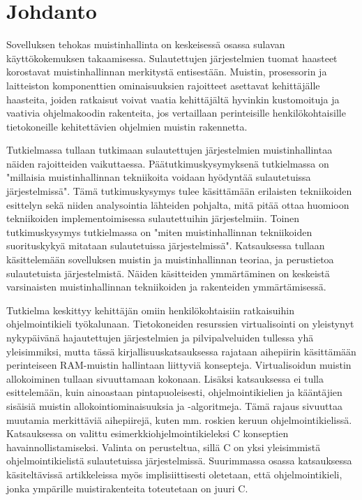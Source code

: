 \chapter{Johdanto} \label{Johdanto}

Sovelluksen tehokas muistinhallinta on keskeisessä osassa sulavan käyttökokemuksen takaamisessa. Sulautettujen järjestelmien tuomat haasteet korostavat muistinhallinnan merkitystä entisestään. Muistin, prosessorin ja laitteiston komponenttien ominaisuuksien rajoitteet asettavat kehittäjälle haasteita, joiden ratkaisut voivat vaatia kehittäjältä hyvinkin kustomoituja ja vaativia ohjelmakoodin rakenteita, jos vertaillaan perinteisille henkilökohtaisille tietokoneille kehitettävien ohjelmien muistin rakennetta.

Tutkielmassa tullaan tutkimaan sulautettujen järjestelmien muistinhallintaa näiden rajoitteiden vaikuttaessa. Päätutkimuskysymyksenä tutkielmassa on "millaisia muistinhallinnan tekniikoita voidaan hyödyntää sulautetuissa järjestelmissä". Tämä tutkimuskysymys tulee käsittämään erilaisten tekniikoiden esittelyn sekä niiden analysointia lähteiden pohjalta, mitä pitää ottaa huomioon tekniikoiden implementoimisessa sulautettuihin järjestelmiin. Toinen tutkimuskysymys tutkielmassa on "miten muistinhallinnan tekniikoiden suorituskykyä mitataan sulautetuissa järjestelmissä". Katsauksessa tullaan käsittelemään sovelluksen muistin ja muistinhallinnan teoriaa, ja perustietoa sulautetuista järjestelmistä. Näiden käsitteiden ymmärtäminen on keskeistä varsinaisten muistinhallinnan tekniikoiden ja rakenteiden ymmärtämisessä.

Tutkielma keskittyy kehittäjän omiin henkilökohtaisiin ratkaisuihin ohjelmointikieli työkalunaan. Tietokoneiden resurssien virtualisointi on yleistynyt nykypäivänä hajautettujen järjestelmien ja pilvipalveluiden tullessa yhä yleisimmiksi, mutta tässä kirjallisuuskatsauksessa rajataan aihepiirin käsittämään perinteiseen RAM-muistin hallintaan liittyviä konsepteja. Virtualisoidun muistin allokoiminen tullaan sivuuttamaan kokonaan. Lisäksi katsauksessa ei tulla esittelemään, kuin ainoastaan pintapuoleisesti, ohjelmointikielien ja kääntäjien sisäisiä muistin allokointiominaisuuksia ja -algoritmeja. Tämä rajaus sivuuttaa muutamia merkittäviä aihepiirejä, kuten mm. roskien keruun ohjelmointikielissä. Katsauksessa on valittu esimerkkiohjelmointikieleksi C konseptien havainnollistamiseksi. Valinta on perusteltua, sillä C on yksi yleisimmistä ohjelmointikielistä sulautetuissa järjestelmissä. Suurimmassa osassa katsauksessa käsiteltävissä artikkeleissa myös implisiittisesti oletetaan, että ohjelmointikieli, jonka ympärille muistirakenteita toteutetaan on juuri C.

